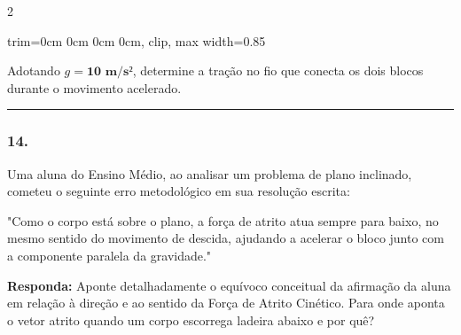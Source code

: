 \documentclass[twoside, 10pt, a4paper]{article}
\newlength{\espacoPreQuestao}\setlength{\espacoPreQuestao}{0.1cm}
\newlength{\espacoQuestao}\setlength{\espacoQuestao}{0.2cm}
\newcommand{\larguraTikz}{0.85\linewidth}
\begin{document}
\begin{multicols*}{2}
\begin{center}
\begin{adjustbox}{trim=0cm 0cm 0cm 0cm, clip, max width=\larguraTikz}
\end{adjustbox}
\end{center}

Adotando $g = \textbf{10 m/s²}$, determine a tração no fio que conecta os dois blocos durante o movimento acelerado.
\par\vspace{\espacoQuestao}

\noindent\textcolor{CorLinha}{\rule{\linewidth}{0.5pt}} 
\par\vspace{\espacoPreQuestao}
\subsubsection*{14.} Uma aluna do Ensino Médio, ao analisar um problema de plano inclinado, cometeu o seguinte erro metodológico em sua resolução escrita:

"Como o corpo está sobre o plano, a força de atrito atua sempre para baixo, no mesmo sentido do movimento de descida, ajudando a acelerar o bloco junto com a componente paralela da gravidade."

\begin{boxresponda}
\textbf{Responda:} Aponte detalhadamente o equívoco conceitual da afirmação da aluna em relação à direção e ao sentido da Força de Atrito Cinético. Para onde aponta o vetor atrito quando um corpo escorrega ladeira abaixo e por quê?
\end{boxresponda}
\par\vspace{\espacoQuestao}


\end{multicols*}
\end{document}
